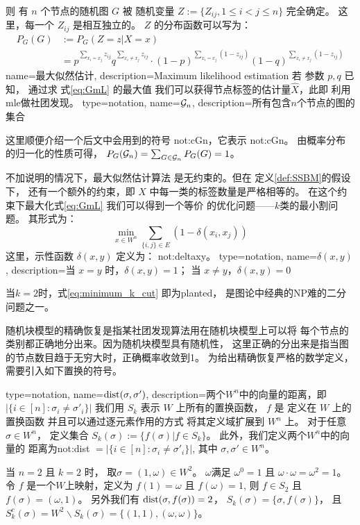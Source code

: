 则 有 $n$ 个节点的随机图 $G$ 
被 
随机变量 $Z:=\{Z_{ij}, 1\leq i<j\leq n\}$ 完全确定。
这里，每一个 $Z_{ij}$ 是相互独立的。
$Z$ 的分布函数可以写为：
\begin{align}\label{eq:mle_sibm}
P_G(G)&:=P_G(Z = z| X=x) \\
&= p^{\sum_{x_i = x_j}
z_{ij}}q^{\sum_{x_i \neq x_j} z_{ij}} 
\cdot (1-p)^{\sum_{x_i = x_j} (1-z_{ij})}
(1-q)^{\sum_{x_i \neq x_j} (1-z_{ij})}
\label{eq:GmL}
\end{align}
{name=最大似然估计,
description={Maximum likelihood estimation}}
若 参数 $p, q$ 已知，
通过求
式\eqref{eq:GmL} 的最大值
我们可以获得节点标签的估计量$\hat{X}$，此即
利用\gls{mle}做社团发现。
{
  type=notation,
  name={$\mathcal{G}_n$},
  description={所有包含$n$个节点的图的集合}
}

这里顺便介绍一个后文中会用到的符号 \gls{not:cGn}，它表示
\glsdesc{not:cGn}。
由概率分布的归一化的性质可得，
$P_G(\mathcal{G}_n) = \sum_{G\in \mathcal{G}_n}P_G(G)=1$。

不加说明的情况下，最大似然估计算法 是无约束的。但在
定义\ref{def:SSBM}的假设下，
还有一个额外的约束，即 $X$ 中每一类的标签数量是严格相等的。
在这个约束下最大化式\eqref{eq:GmL} 我们可以得到一个等价
的优化问题——$k$类的最小割问题。
其形式为：
\begin{equation}\label{eq:minimum_k_cut}
  \min_{x\in W^n} \sum_{ \{i,j\} \in E} (1-\delta(x_i, x_j))
\end{equation}
这里，示性函数 $\delta(x,y)$ 定义为：
\glsdesc{not:deltaxy}。
{
  type=notation,
  name={$\delta(x,y)$},
  description={当 $x=y$ 时，$\delta(x,y) = 1$； 当 $x\neq y$，$\delta(x,y)=0$}
}

当$k=2$时，式\eqref{eq:minimum_k_cut} 即为\gls{planted}，
是图论中经典的NP难的二分问题之一。


随机块模型的精确恢复是指某社团发现算法用在随机块模型上可以将
每个节点的类别都正确地分出来。因为随机块模型具有随机性，
这里正确的分出来是指当图的节点数目趋于无穷大时，正确概率收敛到1。
为给出精确恢复严格的数学定义，需要引入如下置换的符号。

{
  type=notation,
  name={$\operatorname{dist}(\sigma, \sigma')$},
  description={两个$W^n$中的向量的距离，即$|\{i\in[n]:\sigma_i\neq \sigma'_i\}|$}
}
我们用 $S_k$ 表示 $W$  上所有的置换函数， 
$f$ 是 定义在 $W$ 上的置换函数
并且可以通过逐元素作用的方式
将其定义域扩展到 $W^n$ 上。
对于任意 $\sigma \in W^n$，
定义集合 $S_k(\sigma):=\{f(\sigma)| f\in S_k\}$。
此外，我们定义两个$W^n$中的向量的
距离为\gls{not:dist}
$=|\{i\in[n]:\sigma_i\neq \sigma'_i\}|$,
其中 $\sigma,\sigma'\in W^n
$。
\begin{example}
当 $n=2$ 且 $k=2$ 时，
取$\sigma=(1, \omega) \in W^2$。
$\omega$满足
$\omega^0 = 1$ 且 $\omega \cdot \omega = \omega^2 = 1$。
令 $f$ 是一个$W$上映射，定义为
$f(1) = \omega$ 且 $f(\omega)=1$,
则 $f \in S_2$ 且 $f(\sigma) = (\omega, 1)$。
另外我们有 $\operatorname{dist}(\sigma, f(\sigma)) = 2$，
$S_k(\sigma) = \{\sigma, f(\sigma)\}$， 且
$S_k^c(\sigma) = W^2 \backslash S_k(\sigma)
=\{(1, 1), (\omega, \omega)\}$。
\end{example}

